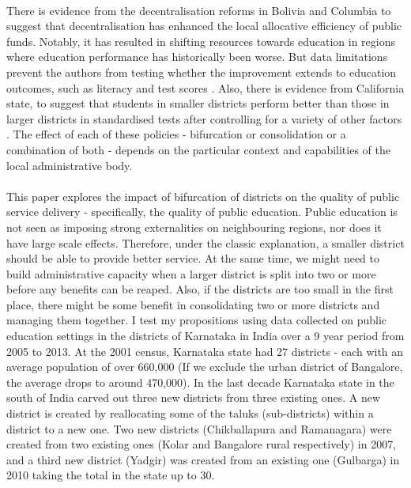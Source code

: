 \documentclass[12pt, a4paper]{article}
\begin{document}
\paragraph{} There is evidence from the decentralisation reforms in Bolivia and Columbia to suggest that decentralisation has enhanced the local allocative efficiency of public funds. Notably, it has resulted in shifting resources towards education in regions where education performance has historically been worse. But data limitations prevent the authors from testing whether the improvement extends to education outcomes, such as literacy and test scores \parencite{faguet2008decentralization}. Also, there is evidence from California state, to suggest that students in smaller districts perform better than those in larger districts in standardised tests after controlling for a variety of other factors \parencite{driscoll2003school}. The effect of each of these policies - bifurcation or consolidation or a combination of both - depends on the particular context and capabilities of the local administrative body. 

\paragraph{}This paper explores the impact of bifurcation of districts on the quality of public service delivery - specifically, the quality of public education. Public education is not seen as imposing strong externalities on neighbouring regions, nor does it have large scale effects. Therefore, under the classic explanation, a smaller district should be able to provide better service. At the same time, we might need to build administrative capacity when a larger district is split into two or more before any benefits can be reaped. Also, if the districts are too small in the first place, there might be some benefit in consolidating two or more districts and managing them together. I test my propositions using data collected on public education settings in the districts of Karnataka in India over a 9 year period from 2005 to 2013. At the 2001 census, Karnataka state had 27 districts - each with an average population of over 660,000 (If we exclude the urban district of Bangalore, the average drops to around 470,000). In the last decade Karnataka state in the south of India carved out three new districts from three existing ones. A new district is created by reallocating some of the taluks (sub-districts) within a district to a new one. Two new districts (Chikballapura and Ramanagara) were created from two existing ones (Kolar and Bangalore rural respectively) in 2007, and a third new district (Yadgir) was created from an existing one (Gulbarga) in 2010 taking the total in the state up to 30. 
\end{document}
